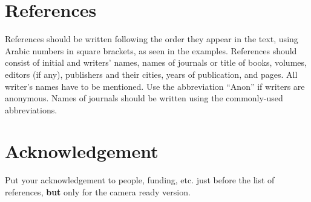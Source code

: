 \documentclass[conference, compsoc, twoside]{IEEEtran}
\begin{document}
\section{References}
References should be written following the order they appear in the text, using Arabic numbers in square brackets, as seen in the examples. References should consist of initial and writers’ names, names of journals or title of books, volumes, editors (if any), publishers and their cities, years of publication, and pages. All writer’s names have to be mentioned. Use the abbreviation “Anon” if writers are anonymous. Names of journals should be written using the commonly-used abbreviations.

\section*{Acknowledgement}
Put your acknowledgement to people, funding, etc. just before the list of references, \textbf{but} only for the camera ready version.
%
%

\balance
\end{document}
